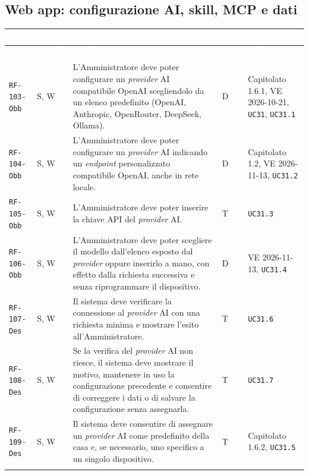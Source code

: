 \documentclass[12pt,a4paper]{article}
\newcommand{\thc}[1]{\textcolor{white}{\textbf{#1}}}
\newcommand{\rl}{\\ \arrayrulecolor{bfline}\hline}
\begin{document}
\subsection{Web app: configurazione AI, skill, MCP e dati}
\begin{longtable}{>{\raggedright\arraybackslash}p{}>{\centering\arraybackslash}p{}>{\raggedright\arraybackslash}p{}>{\centering\arraybackslash}p{}>{\raggedright\arraybackslash}p{}}
\rowcolor{bfblue}\thc{ID} & \thc{Comp.} & \thc{Requisito} & \thc{Ver.} & \thc{Fonti} \\ \endfirsthead
\rowcolor{bfblue}\thc{ID} & \thc{Comp.} & \thc{Requisito} & \thc{Ver.} & \thc{Fonti} \\ \endhead
\texttt{RF-103-Obb} & S, W & L'Amministratore deve poter configurare un \emph{provider} AI compatibile OpenAI scegliendolo da un elenco predefinito (OpenAI, Anthropic, OpenRouter, DeepSeek, Ollama). & D & Capitolato 1.6.1, VE 2026-10-21, \texttt{UC31}, \texttt{UC31.1} \rl

\texttt{RF-104-Obb} & S, W & L'Amministratore deve poter configurare un \emph{provider} AI indicando un \emph{endpoint} personalizzato compatibile OpenAI, anche in rete locale. & D & Capitolato 1.2, VE 2026-11-13, \texttt{UC31.2} \rl

\texttt{RF-105-Obb} & S, W & L'Amministratore deve poter inserire la chiave API del \emph{provider} AI. & T & \texttt{UC31.3} \rl

\texttt{RF-106-Obb} & S, W & L'Amministratore deve poter scegliere il modello dall'elenco esposto dal \emph{provider} oppure inserirlo a mano, con effetto dalla richiesta successiva e senza riprogrammare il dispositivo. & D & VE 2026-11-13, \texttt{UC31.4} \rl

\texttt{RF-107-Des} & S, W & Il sistema deve verificare la connessione al \emph{provider} AI con una richiesta minima e mostrare l'esito all'Amministratore. & T & \texttt{UC31.6} \rl

\texttt{RF-108-Des} & S, W & Se la verifica del \emph{provider} AI non riesce, il sistema deve mostrare il motivo, mantenere in uso la configurazione precedente e consentire di correggere i dati o di salvare la configurazione senza assegnarla. & T & \texttt{UC31.7} \rl

\texttt{RF-109-Des} & S, W & Il sistema deve consentire di assegnare un \emph{provider} AI come predefinito della casa e, se necessario, uno specifico a un singolo dispositivo. & T & Capitolato 1.6.2, \texttt{UC31.5} \rl


\end{longtable}
\end{document}
